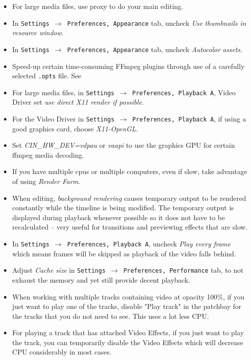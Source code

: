 \begin{itemize}
	\item For large media files, use proxy to do your main editing.
	\item In \texttt{Settings $\rightarrow$ Preferences, Appearance} tab, uncheck \textit{Use thumbnails in resource window}.
	\item In \texttt{Settings $\rightarrow$ Preferences, Appearance} tab, uncheck \textit{Autocolor assets}.
	\item  Speed-up certain time-consuming FFmpeg plugins through use of a carefully selected \texttt{.opts} file. See 
	\item For large media files, in \texttt{Settings $\rightarrow$ Preferences, Playback A}, Video Driver set \textit{use direct X11 render if possible}.
	\item For the Video Driver in \texttt{Settings $\rightarrow$ Preferences, Playback A}, if using a good graphics card, choose \textit{X11-OpenGL}.
	\item Set \textit{CIN\_HW\_DEV=vdpau} or \textit{vaapi} to use the graphics GPU for certain ffmpeg media decoding.
	\item If you have multiple cpus or multiple computers, even if slow, take advantage of using \textit{Render Farm}.
	\item When editing, \textit{background rendering} causes temporary output to be rendered constantly while the
	timeline is being modified. The temporary output is displayed during playback whenever possible so 
	it does not have to be recalculated -- very useful for transitions and previewing effects that are slow.
	\item In  \texttt{Settings $\rightarrow$ Preferences, Playback A}, uncheck \textit{Play every frame} which means frames will be skipped as playback of the video falls behind.
	\item Adjust \textit{Cache size} in \texttt{Settings $\rightarrow$ Preferences, Performance} tab, to not exhaust the memory and yet still provide decent playback.
	\item When working with multiple tracks containing video at opacity 100\%, if you just want to play one of the tracks, disable "Play track" in the patchbay for the tracks that you do not need to see.  This uses a lot less CPU.
	\item For playing a track that has attached Video Effects, if you just want to play the track, you can temporarily disable the Video Effects which will decrease CPU considerably in most cases.
\end{itemize}


